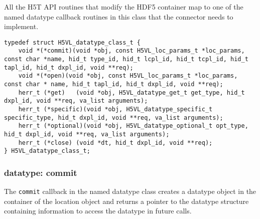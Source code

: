 All the H5T API routines that modify the HDF5 container map to one of
the named datatype callback routines in this class that the connector needs to
implement.

\begin{lstlisting}[caption={Structure for datatype callback routines, H5VLconnector.h}, captionpos=b, label={lst:H5Tclass}]
typedef struct H5VL_datatype_class_t {                                           
    void *(*commit)(void *obj, const H5VL_loc_params_t *loc_params, const char *name, hid_t type_id, hid_t lcpl_id, hid_t tcpl_id, hid_t tapl_id, hid_t dxpl_id, void **req);
    void *(*open)(void *obj, const H5VL_loc_params_t *loc_params, const char * name, hid_t tapl_id, hid_t dxpl_id, void **req);
    herr_t (*get)   (void *obj, H5VL_datatype_get_t get_type, hid_t dxpl_id, void **req, va_list arguments);
    herr_t (*specific)(void *obj, H5VL_datatype_specific_t specific_type, hid_t dxpl_id, void **req, va_list arguments);            
    herr_t (*optional)(void *obj, H5VL_datatype_optional_t opt_type, hid_t dxpl_id, void **req, va_list arguments); 
    herr_t (*close) (void *dt, hid_t dxpl_id, void **req);                       
} H5VL_datatype_class_t; 
\end{lstlisting}

\subsubsection{datatype: commit}
The \texttt{commit} callback in the named datatype class creates a datatype object in the container of the location object and
returns a pointer to the datatype structure containing information to access the datatype in future calls.\bigskip

